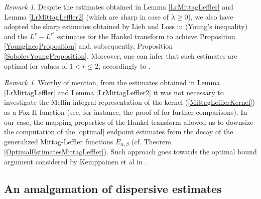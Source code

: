 \documentclass{amsart}
\theoremstyle{definition}
\theoremstyle{remark}
\newtheorem{remark}[theorem]{Remark}
\numberwithin{equation}{section}
\begin{document}
\begin{remark}
	Despite the estimates obtained in Lemma \ref{LrMittagLeffler} and Lemma \ref{LrMittagLeffler2} (which are sharp in case of $\lambda\geq 0$), we also have adopted the sharp estimates obtained by Lieb and Loss in \cite[Theorem 4.2]{LiebLoss01} (Young's inequality) and the $L^r-L^{r'}$ estimates for the Hankel transform to achieve Proposition \ref{YoungIneqProposition} and, subsequently, Proposition \ref{SobolevYoungProposition}. Moreover, one can infer that such estimates are optimal for values of $1<r\leq 2$, accordingly to \cite[Proposition 2.1.]{DeCarli08}.
\end{remark}

\begin{remark}
	Worthy of mention, from the estimates obtained in Lemma \ref{LrMittagLeffler} and Lemma \ref{LrMittagLeffler2} it was not necessary to investigate the Mellin integral representation of the kernel (\ref{MittagLefflerKernel}) as a Fox-H function (see, for instance, the proof of \cite[Lemma 3.3]{KSZ17} for further comparisons). In our case, the mapping properties of the Hankel transform allowed us to downsize the computation of the [optimal] endpoint estimates from the decay of the generalized Mittag-Leffler functions $E_{\alpha,\beta}$ (cf. Theorem \ref{OptimalEstimatesMittagLeffler}). Such approach goes towards the optimal bound argument considered by Kemppainen et al in \cite[Remark 3.1]{KSVZ16}.
\end{remark}


\subsection{An amalgamation of dispersive estimates}\label{Overview}
\end{document}
